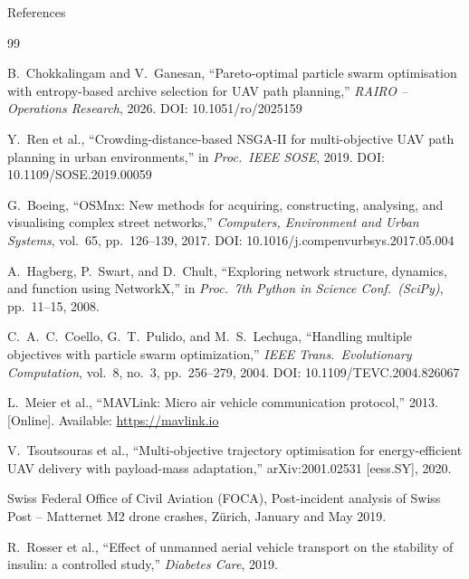 \documentclass[aspectratio=169,11pt]{beamer}
\begin{document}
\begin{frame}[allowframebreaks]{References}
  \footnotesize
  \begin{thebibliography}{99}

      B.\ Chokkalingam and V.\ Ganesan,
      ``Pareto-optimal particle swarm optimisation with entropy-based
      archive selection for UAV path planning,''
      \emph{RAIRO -- Operations Research}, 2026.
      DOI: 10.1051/ro/2025159

      Y.\ Ren et al.,
      ``Crowding-distance-based NSGA-II for multi-objective UAV path
      planning in urban environments,''
      in \emph{Proc.\ IEEE SOSE}, 2019.
      DOI: 10.1109/SOSE.2019.00059

      G.\ Boeing,
      ``OSMnx: New methods for acquiring, constructing, analysing, and
      visualising complex street networks,''
      \emph{Computers, Environment and Urban Systems}, vol.~65,
      pp.~126--139, 2017.
      DOI: 10.1016/j.compenvurbsys.2017.05.004

      A.\ Hagberg, P.\ Swart, and D.\ Chult,
      ``Exploring network structure, dynamics, and function using
      NetworkX,'' in \emph{Proc.\ 7th Python in Science Conf.\ (SciPy)},
      pp.~11--15, 2008.

      C.\ A.\ C.\ Coello, G.\ T.\ Pulido, and M.\ S.\ Lechuga,
      ``Handling multiple objectives with particle swarm optimization,''
      \emph{IEEE Trans.\ Evolutionary Computation}, vol.~8, no.~3,
      pp.~256--279, 2004.
      DOI: 10.1109/TEVC.2004.826067

      L.\ Meier et al.,
      ``MAVLink: Micro air vehicle communication protocol,'' 2013.
      [Online]. Available: \url{https://mavlink.io}

      V.\ Tsoutsouras et al.,
      ``Multi-objective trajectory optimisation for energy-efficient UAV
      delivery with payload-mass adaptation,''
      arXiv:2001.02531 [eess.SY], 2020.

      Swiss Federal Office of Civil Aviation (FOCA),
      Post-incident analysis of Swiss Post -- Matternet M2 drone crashes,
      Z\"{u}rich, January and May 2019.

      R.\ Rosser et al.,
      ``Effect of unmanned aerial vehicle transport on the stability of
      insulin: a controlled study,''
      \emph{Diabetes Care}, 2019.


\end{thebibliography}
\end{frame}
\end{document}
